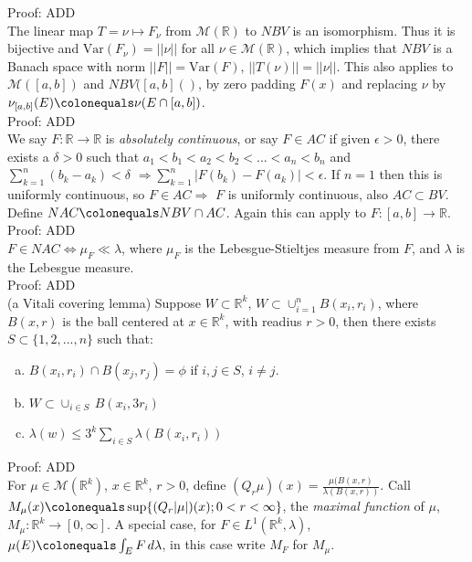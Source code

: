 \documentclass[12pt]{article}
\newcommand{\reals}[0] { \mathbb{R}}
\newcommand{\eps}[0] {  \epsilon }
\newcommand{\M}[0] { \mathcal{M} }
\newcommand{\rimply}[0] { \Rightarrow }
\newcommand{\lrimply}[0] { \Leftrightarrow }
\newcommand{\rarw}[0] { \rightarrow }
\newcommand{ \defeq }[0] { \colonequals }
\newcommand{ \Var } { \textrm{Var} }
\begin{document}
\noindent
Proof: ADD \\


The linear map $T = \nu \mapsto F_\nu$ from $\M(\reals)$ to $NBV$ is an isomorphism. Thus it is bijective and $\Var(F_\nu) = ||\nu||$ for all $\nu \in \M(\reals)$, which implies that $NBV$ is a Banach space with norm $||F|| = \Var(F)$, $||T(\nu)|| = ||\nu||$.  This also applies to $\M([a,b])$ and $NBV([a,b]()$, by zero padding $F(x)$ and replacing $\nu$ by $\nu_{[a,b]}(E) \defeq \nu(E \cap [a,b])$. \\


\noindent
Proof: ADD \\

We say $F: \reals \rarw \reals$ is \emph{absolutely continuous}, or say $F \in AC$ if given $\eps>0$, there exists a $\delta>0$ such that $a_1 < b_1 < a_2 < b_2 < ... < a_n < b_n$ and $\sum_{k=1}^n (b_k-a_k) < \delta$ $\rimply \sum_{k=1}^n |F(b_k) - F(a_k)| < \eps$. If $n=1$ then this is uniformly continuous, so $F \in AC \rimply$ $F$ is uniformly continuous, also $AC \subset BV$. Define $NAC \defeq NBV \cap AC$. Again this can apply to $F: [a,b] \rarw \reals$. \\

\noindent
Proof: ADD \\

$F \in NAC \lrimply \mu_F \ll \lambda$, where $\mu_F$ is the Lebesgue-Stieltjes measure from $F$, and $\lambda$ is the Lebesgue measure. \\


\noindent
Proof: ADD \\



(a Vitali covering lemma) Suppose $W \subset \reals^k$, $W \subset \cup_{i=1}^n B(x_i, r_i)$, where $B(x,r)$ is the ball centered at $x \in \reals^k$, with readius $r>0$, then there exists $S \subset \{ 1,2,...,n\}$ such that:

\begin{enumerate}[a)]
\item
$B(x_i, r_i) \cap B(x_j, r_j) = \phi$ if $i,j \in S$, $i \not = j$.
\item
$ W \subset \cup_{i \in S} \, B(x_i, 3 r_i)$
\item
$ \lambda(w) \le 3^k \sum_{i \in S} \lambda(B(x_i, r_i )) $
\end{enumerate}


\noindent
Proof: ADD \\


For $ \mu \in \M(\reals^k)$, $x \in \reals^k$, $r > 0$, define $(Q_r \mu)(x) = \frac{\mu(B(x,r)}{\lambda(B(x,r))}$. Call $ M_\mu(x) \defeq \sup \{ (Q_r|\mu|)(x); 0 < r < \infty \}$, the \emph{maximal function} of $\mu$, $M_\mu: \reals^k \rarw [0, \infty]$. A special case, for $F \in L^1(\reals^k, \lambda)$, $\mu(E) \defeq \int_E F \, d\lambda$, in this case write $M_F$ for $M_\mu$.  \\
\end{document}
